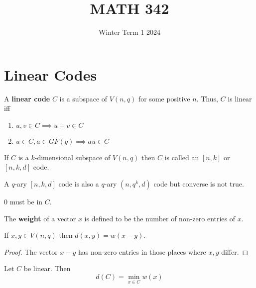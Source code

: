 \documentclass{article}
\title{MATH 342}
\date{Winter Term 1 2024}
\begin{document}
\maketitle

\begin{tcolorbox}[title=,
    fonttitle=\huge\sffamily\bfseries\selectfont,interior style={left
    color=contcol1!40!white,right color=contcol2!40!white},frame
    style={left color=contcol1!80!white,right
    color=contcol2!80!white},coltitle=black,top=2mm,bottom=2mm,left=2mm,right=2mm,drop
  fuzzy shadow,enhanced,breakable]
  \tableofcontents
\end{tcolorbox}

\newpage

\section{Linear Codes}
\begin{definition}
  A \textbf{linear code} \( C \) is a subspace of \( V(n, q) \) for
  some positive \( n \). Thus, \( C \) is linear iff
  \begin{enumerate}
    \item \( u, v \in C \implies u + v \in C \)
    \item \( u \in C, a \in GF(q) \implies au \in C \)
  \end{enumerate}

  If \( C \) is a \( k \)-dimensional subspace of \( V(n, q) \) then
  \( C \) is called an \( [n, k] \) or \( [n, k, d] \) code.
\end{definition}
\begin{remark}
  A \( q \)-ary \( [n, k, d] \) code is also a \( q \)-ary \( (n,
  q^k, d) \) code but converse is not true.

  \( 0 \) must be in \( C \).
\end{remark}
\begin{definition}
  The \textbf{weight} of a vector \( x \) is defined to be the number
  of non-zero entries of \( x \).
\end{definition}
\begin{lemma}
  If \( x, y \in V(n, q) \) then \(
  d(x, y) = w(x - y) \).
\end{lemma}
\begin{proof}
  The vector \( x-y \) has non-zero entries in those places where \(
  x, y \) differ.
\end{proof}
\begin{theorem}
  Let \( C \) be linear. Then \[
    d(C) = \min_{x \in C}w(x)
  \]
\end{theorem}
\end{document}
